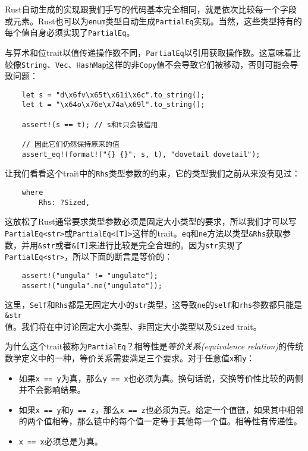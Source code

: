 Rust自动生成的实现跟我们手写的代码基本完全相同，就是依次比较每一个字段或元素。Rust也可以为\texttt{enum}类型自动生成\texttt{PartialEq}实现。当然，这些类型持有的每个值自身必须实现了\texttt{PartialEq}。

与算术和位trait以值传递操作数不同，\texttt{PartialEq}以引用获取操作数。这意味着比较像\texttt{String}、\texttt{Vec}、\texttt{HashMap}这样的非\texttt{Copy}值不会导致它们被移动，否则可能会导致问题：
\begin{verbatim}
    let s = "d\x6fv\x65t\x61i\x6c".to_string();
    let t = "\x64o\x76e\x74a\x69l".to_string();

    assert!(s == t); // s和t只会被借用

    // 因此它们仍然保持原来的值
    assert_eq!(format!("{} {}", s, t), "dovetail dovetail");
\end{verbatim}

让我们看看这个trait中的\texttt{Rhs}类型参数的约束，它的类型我们之前从来没有见过：
\begin{verbatim}
    where
        Rhs: ?Sized,
\end{verbatim}

这放松了Rust通常要求类型参数必须是固定大小类型的要求，所以我们才可以写\texttt{PartialEq<str>}或\texttt{PartialEq<[T]>}这样的trait。\texttt{eq}和\texttt{ne}方法以类型\texttt{\&Rhs}获取参数，并用\texttt{\&str}或者\texttt{\&[T]}来进行比较是完全合理的。因为\texttt{str}实现了\texttt{PartialEq<str>}，所以下面的断言是等价的：
\begin{verbatim}
    assert!("ungula" != "ungulate");
    assert!("ungula".ne("ungulate"));
\end{verbatim}

这里，\texttt{Self}和\texttt{Rhs}都是无固定大小的\texttt{str}类型，这导致\texttt{ne}的\texttt{self}和\texttt{rhs}参数都只能是\texttt{\&str}\\
值。我们将在中讨论固定大小类型、非固定大小类型以及\texttt{Sized} trait。

为什么这个trait被称为\texttt{PartialEq}？相等性是\emph{等价关系(equivalence relation)}的传统数学定义中的一种，等价关系需要满足三个要求。对于任意值\texttt{x}和\texttt{y}：
\begin{itemize}
    \item 如果\texttt{x == y}为真，那么\texttt{y == x}也必须为真。换句话说，交换等价性比较的两侧并不会影响结果。
    \item 如果\texttt{x == y}和\texttt{y == z}，那么\texttt{x == z}也必须为真。给定一个值链，如果其中相邻的两个值相等，那么链中的每个值一定等于其他每一个值。相等性有传递性。
    \item \texttt{x == x}必须总是为真。
\end{itemize}


